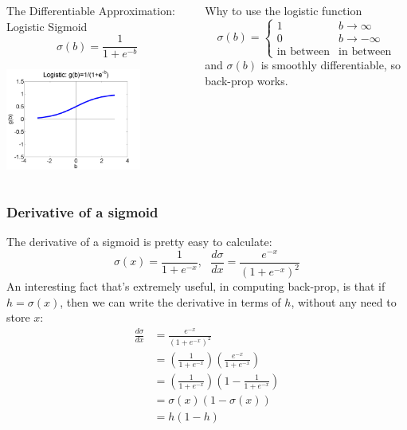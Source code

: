 \documentclass{beamer}
\begin{document}
\begin{frame}
  \begin{columns}[t]
    \column{2.25in}
    \begin{block}{The Differentiable Approximation: Logistic Sigmoid}
      \[
      \sigma(b)=\frac{1}{1+e^{-b}}
      \]
      \centerline{\includegraphics[width=1.75in]{../lec07/figs/nn_logistic.png}}
    \end{block}
    \column{2.25in}
    \begin{block}{Why to use the logistic function}
      \[
      \sigma(b) = \begin{cases}
        1 & b\rightarrow\infty\\
        0 & b\rightarrow -\infty\\
        \mbox{in between} & \mbox{in between}
      \end{cases}
      \]
      and $\sigma(b)$ is smoothly differentiable, so
      back-prop works.
    \end{block}
  \end{columns}
\end{frame}

\begin{frame}
  \frametitle{Derivative of a sigmoid}
  The derivative of a sigmoid is pretty easy to calculate:
  \[
  \sigma(x)=\frac{1}{1+e^{-x}},~~~\frac{d\sigma}{dx}=\frac{e^{-x}}{(1+e^{-x})^2}
  \]
  An interesting fact that's extremely useful, in computing back-prop,
  is that if $h=\sigma(x)$, then we can write the derivative in terms
  of $h$, without any need to store $x$:
  \begin{align*}
    \frac{d\sigma}{dx} &=\frac{e^{-x}}{(1+e^{-x})^2}\\
    &=\left(\frac{1}{1+e^{-x}}\right)\left(\frac{e^{-x}}{1+e^{-x}}\right)\\
    &=\left(\frac{1}{1+e^{-x}}\right)\left(1-\frac{1}{1+e^{-x}}\right)\\
    &=\sigma(x)(1-\sigma(x))\\
    &=h(1-h)\\
  \end{align*}
\end{frame}
\end{document}
